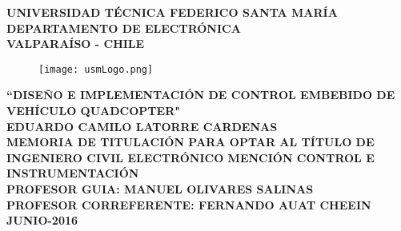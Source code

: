 \documentclass[../main.tex]{subfiles}
\begin{document}
	\thispagestyle{empty}
	\begin{center}
		\linespread{1.15}
		\textbf{
			\large{UNIVERSIDAD TÉCNICA FEDERICO SANTA MARÍA\\}
			\normalsize{DEPARTAMENTO DE ELECTRÓNICA\\VALPARAÍSO - CHILE\\}
			}		
		\vspace{0.5cm}
		\begin{figure}[H]
			\centering
			\texttt{[image: usmLogo.png]}
		\end{figure}
		\vspace{0.5cm}
		\linespread{1}\hangindent=0cm
		\textbf{
			\Large “DISEÑO E IMPLEMENTACIÓN DE CONTROL EMBEBIDO DE VEHÍCULO QUADCOPTER"
			}\\
		\vspace{3cm}
		\hangindent=0cm\large \textbf{
			EDUARDO CAMILO LATORRE CARDENAS
			}\\
		\vspace{0.5cm}
		\hangindent=0cm\normalsize \textbf{
			MEMORIA DE TITULACIÓN PARA OPTAR AL TÍTULO DE INGENIERO CIVIL ELECTRÓNICO MENCIÓN CONTROL E INSTRUMENTACIÓN
			}\\
		\vspace{1cm}
		\hangindent=0cm\normalsize \textbf{
			PROFESOR GUIA: \hspace{2cm} MANUEL OLIVARES SALINAS
			}\\
		\vspace{0.5cm}
		\hangindent=0cm\normalsize \textbf{
			PROFESOR CORREFERENTE: \hspace{2cm} FERNANDO AUAT CHEEIN
			}\\
		\vspace{0.5cm}
		\hangindent=0cm\large \textbf{JUNIO-2016}\\		
	\end{center}
	\newpage
\end{document}

